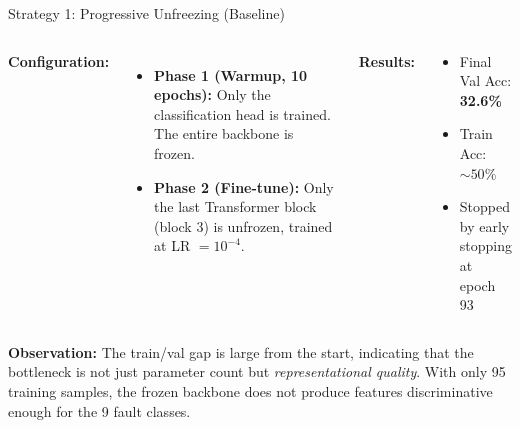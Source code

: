 \documentclass{beamer}
\begin{document}
\begin{frame}{Strategy 1: Progressive Unfreezing (Baseline)}
    \begin{columns}
        \textbf{Configuration:}
        \begin{itemize}
            \item \textbf{Phase 1 (Warmup, 10 epochs):} Only the classification head is trained. The entire backbone is frozen.
            \item \textbf{Phase 2 (Fine-tune):} Only the last Transformer block (block 3) is unfrozen, trained at LR $= 10^{-4}$.
        \end{itemize}

        \textbf{Results:}
        \begin{block}{}
            \begin{itemize}
                \item Final Val Acc: \textbf{32.6\%}
                \item Train Acc: $\sim 50\%$
                \item Stopped by early stopping at epoch 93
            \end{itemize}
        \end{block}
    \end{columns}

    \vspace{0.3cm}
    \textbf{Observation:} The train/val gap is large from the start, indicating that the bottleneck is not just parameter count but \textit{representational quality}. With only 95 training samples, the frozen backbone does not produce features discriminative enough for the 9 fault classes.
\end{frame}
\end{document}
